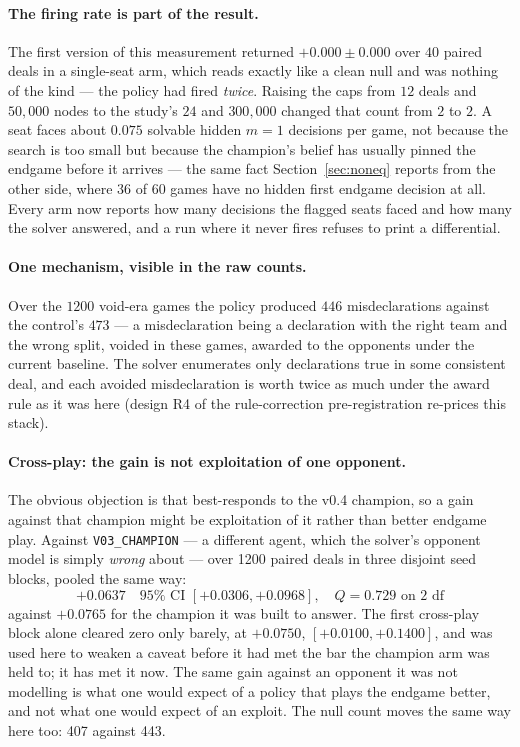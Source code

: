 \documentclass[11pt,letterpaper]{article}
\begin{document}
\paragraph{The firing rate is part of the result.} The first version of this
measurement returned $+0.000 \pm 0.000$ over $40$ paired deals in a
single-seat arm, which reads exactly like a clean null and was nothing of the
kind --- the policy had fired \emph{twice}. Raising the caps from $12$ deals
and $50{,}000$ nodes to the study's $24$ and $300{,}000$ changed that count from
$2$ to $2$. A seat faces about $0.075$ solvable hidden $m = 1$ decisions per
game, not because the search is too small but because the champion's belief has
usually pinned the endgame before it arrives --- the same fact
Section~\ref{sec:noneq} reports from the other side, where $36$ of $60$ games
have no hidden first endgame decision at all. Every arm now reports how many
decisions the flagged seats faced and how many the solver answered, and a run
where it never fires refuses to print a differential.

\paragraph{One mechanism, visible in the raw counts.} Over the $1200$
void-era games the policy produced $446$ misdeclarations against the
control's $473$ --- a misdeclaration being a declaration with the right team
and the wrong split, voided in these games, awarded to the opponents under
the current baseline. The solver enumerates only declarations true in some
consistent deal, and each avoided misdeclaration is worth twice as much
under the award rule as it was here (design R4 of the rule-correction
pre-registration re-prices this stack).

\paragraph{Cross-play: the gain is not exploitation of one opponent.} The
obvious objection is that  best-responds to the v0.4
champion, so a gain against that champion might be exploitation of it rather
than better endgame play. Against \texttt{V03\_CHAMPION} --- a different agent,
which the solver's opponent model is simply \emph{wrong} about --- over
1200 paired deals in three disjoint seed
blocks, pooled the same way:
\[
  +0.0637 \quad 95\%\text{ CI } [+0.0306, +0.0968], \quad Q = 0.729 \text{ on } 2 \text{ df}
\]
against $+0.0765$ for the champion it was built to answer. The first
cross-play block alone cleared zero only barely, at
$+0.0750$, $[+0.0100, +0.1400]$, and was used here to weaken a caveat before it
had met the bar the champion arm was held to; it has met it now. The same gain
against an opponent it was not modelling is what one would expect of a policy
that plays the endgame better, and not what one would expect of an exploit. The
null count moves the same way here too: 407 against 443.
\end{document}
